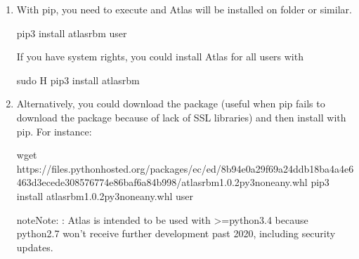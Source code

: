 \documentclass[letterpaper,10pt,english]{sphinxmanual}
\begin{document}
\begin{enumerate}
%
\item {} 

With pip, you need to execute and Atlas will be installed on
 folder or similar.

\begin{sphinxVerbatim}[commandchars=\\\{\}]
pip3 install atlas\PYGZus{}rbm \PYGZhy{}\PYGZhy{}user
\end{sphinxVerbatim}

If you have system rights, you could install Atlas for all users with

\begin{sphinxVerbatim}[commandchars=\\\{\}]
sudo \PYGZhy{}H pip3 install atlas\PYGZus{}rbm
\end{sphinxVerbatim}

\item {} 

Alternatively, you could download the package (useful when pip fails to download
the package because of lack of SSL libraries) and then install with pip. For instance:

\begin{sphinxVerbatim}[commandchars=\\\{\}]
wget https://files.pythonhosted.org/packages/ec/ed/8b94e0a29f69a24ddb18ba4a4e6463d3ecede308576774e86baf6a84b998/atlas\PYGZus{}rbm\PYGZhy{}1.0.2\PYGZhy{}py3\PYGZhy{}none\PYGZhy{}any.whl
pip3 install atlas\PYGZus{}rbm\PYGZhy{}1.0.2\PYGZhy{}py3\PYGZhy{}none\PYGZhy{}any.whl \PYGZhy{}\PYGZhy{}user
\end{sphinxVerbatim}

\begin{sphinxadmonition}{note}{Note:}
:
Atlas is intended to be used with \textgreater{}=python3.4 because python2.7 won’t receive
further development past 2020, including security updates.
\end{sphinxadmonition}


\end{enumerate}
\end{document}
